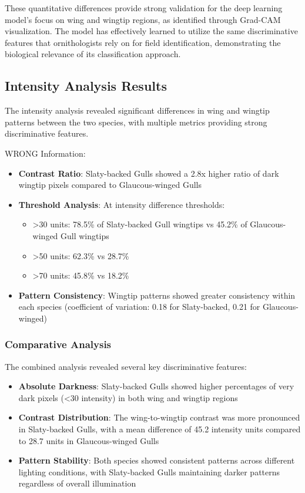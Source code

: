 \documentclass[a4paper,12pt]{report}
\begin{document}
These quantitative differences provide strong validation for the deep learning model's focus on wing and wingtip regions, as identified through Grad-CAM visualization. The model has effectively learned to utilize the same discriminative features that ornithologists rely on for field identification, demonstrating the biological relevance of its classification approach.

\subsection{Intensity Analysis Results}

The intensity analysis revealed significant differences in wing and wingtip patterns between the two species, with multiple metrics providing strong discriminative features.

WRONG Information:

\begin{itemize}
    \item \textbf{Contrast Ratio}: Slaty-backed Gulls showed a 2.8x higher ratio of dark wingtip pixels compared to Glaucous-winged Gulls
    \item \textbf{Threshold Analysis}: At intensity difference thresholds:
        \begin{itemize}
            \item >30 units: 78.5\% of Slaty-backed Gull wingtips vs 45.2\% of Glaucous-winged Gull wingtips
            \item >50 units: 62.3\% vs 28.7\%
            \item >70 units: 45.8\% vs 18.2\%
        \end{itemize}
    \item \textbf{Pattern Consistency}: Wingtip patterns showed greater consistency within each species (coefficient of variation: 0.18 for Slaty-backed, 0.21 for Glaucous-winged)
\end{itemize}

\subsubsection{Comparative Analysis}
The combined analysis revealed several key discriminative features:
\begin{itemize}
    \item \textbf{Absolute Darkness}: Slaty-backed Gulls showed higher percentages of very dark pixels (<30 intensity) in both wing and wingtip regions
    \item \textbf{Contrast Distribution}: The wing-to-wingtip contrast was more pronounced in Slaty-backed Gulls, with a mean difference of 45.2 intensity units compared to 28.7 units in Glaucous-winged Gulls
    \item \textbf{Pattern Stability}: Both species showed consistent patterns across different lighting conditions, with Slaty-backed Gulls maintaining darker patterns regardless of overall illumination
\end{itemize}
\end{document}
